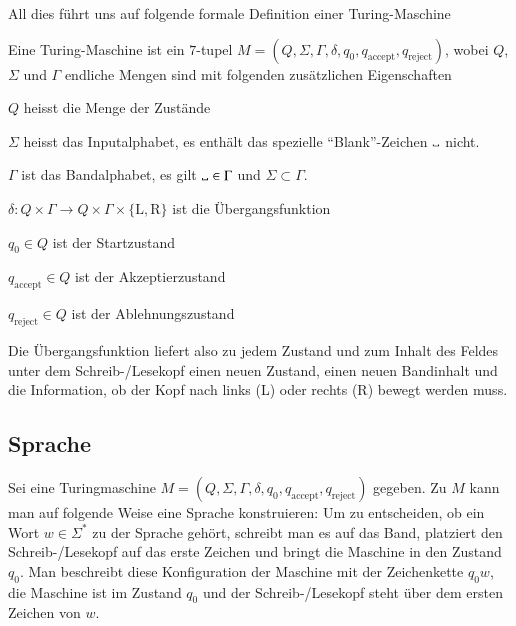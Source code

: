 All dies führt uns auf folgende formale Definition einer Turing-Maschine
\begin{definition}
%
Eine Turing-Maschine ist ein $7$-tupel
$M=(Q,\Sigma,\Gamma,\delta,q_0,q_{\text{accept}},q_{\text{reject}})$,
wobei $Q$, $\Sigma$ und $\Gamma$ endliche Mengen sind mit folgenden
zusätzlichen Eigenschaften
\begin{compactenum}
%
\item $Q$ heisst die Menge der Zustände
%
%
%
%
\item $\Sigma$ heisst das Inputalphabet, es enthält das spezielle
``Blank''-Zeichen $\blank$ nicht.
%
\item $\Gamma$ ist das Bandalphabet, es gilt $\blank\in\Gamma$ und
$\Sigma\subset\Gamma$.
%
\item $\delta\colon Q\times \Gamma\to Q\times\Gamma\times\{\text{L},\text{R}\}$
ist die Übergangsfunktion
%
\item $q_0\in Q$ ist der Startzustand
%
\item $q_{\text{accept}}\in Q$ ist der Akzeptierzustand
%
\item $q_{\text{reject}}\in Q$ ist der Ablehnungszustand
\end{compactenum}
\end{definition}
Die Übergangsfunktion liefert also zu jedem Zustand und zum
Inhalt des Feldes unter dem Schreib-/Lesekopf einen neuen
Zustand, einen neuen Bandinhalt und die Information, ob
der Kopf nach links (L) oder rechts (R) bewegt werden muss.

\subsection{Sprache}
Sei eine Turingmaschine
$M=(Q,\Sigma,\Gamma,\delta,q_0,q_{\text{accept}},q_{\text{reject}})$
gegeben.
Zu $M$ kann man auf folgende Weise eine Sprache konstruieren:
Um zu entscheiden, ob ein Wort $w\in\Sigma^*$
zu der Sprache gehört,
schreibt man es auf das Band, platziert den Schreib-/Lesekopf auf
das erste Zeichen und bringt die Maschine in den Zustand $q_0$.
%
Man beschreibt diese Konfiguration der Maschine mit der Zeichenkette
$q_0w$, die Maschine ist im Zustand $q_0$ und der Schreib-/Lesekopf
steht über dem ersten Zeichen von $w$.

